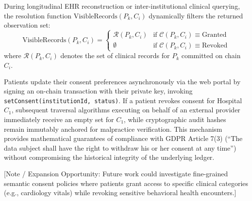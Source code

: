 During longitudinal EHR reconstruction or inter-institutional clinical querying, the resolution function $\text{VisibleRecords}(P_k, C_i)$ dynamically filters the returned observation set:
\begin{equation}
\text{VisibleRecords}(P_k, C_i) = \begin{cases} 
\mathcal{R}(P_k, C_i) & \text{if } \mathcal{C}(P_k, C_i) \equiv \text{Granted} \\
\emptyset & \text{if } \mathcal{C}(P_k, C_i) \equiv \text{Revoked}
\end{cases}
\end{equation}
where $\mathcal{R}(P_k, C_i)$ denotes the set of clinical records for $P_k$ committed on chain $C_i$.

Patients update their consent preferences asynchronously via the web portal by signing an on-chain transaction with their private key, invoking \texttt{setConsent(institutionId, status)}. If a patient revokes consent for Hospital $C_1$, subsequent traversal algorithms executing on behalf of an external provider immediately receive an empty set for $C_1$, while cryptographic audit hashes remain immutably anchored for malpractice verification. This mechanism provides mathematical guarantees of compliance with GDPR Article 7(3) (``The data subject shall have the right to withdraw his or her consent at any time'') without compromising the historical integrity of the underlying ledger.

[Note / Expansion Opportunity: Future work could investigate fine-grained semantic consent policies where patients grant access to specific clinical categories (e.g., cardiology vitals) while revoking sensitive behavioral health encounters.]
